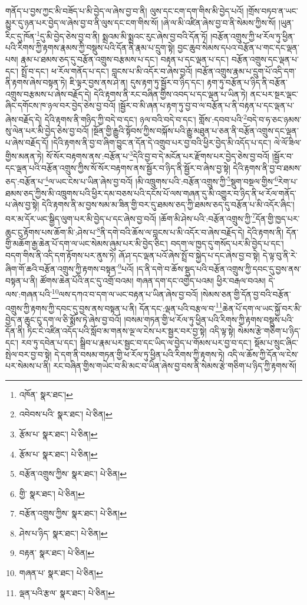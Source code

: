 གནོད་པ་བྱས་ཀྱང་མི་བཟོད་པ་མི་བྱེད་ལ་ཞེས་བྱ་བ་ནི། ལུས་དང་ངག་དག་གིས་མི་བྱེད་པའོ། །གྲོས་བཏབ་ན་ཡང་མྱུར་དུ་ཉན་པར་བྱེད་ལ་ཞེས་བྱ་བ་ནི་ལུས་དང་ངག་གིས་སོ། །ཞེ་ལ་མི་འཛིན་ཞེས་བྱ་བ་ནི་སེམས་ཀྱིས་སོ། །ཡུན་རིང་དུ་ཁོན་\footnote{འཁོན་  སྣར་ཐང་། }དུ་མི་བྱེད་ཅེས་བྱ་བ་ནི། སྨྲའམ་མི་སྨྲའང་རུང་ཞེས་བྱ་བའི་དོན་ཏོ། །བརྩོན་འགྲུས་ཀྱི་ཕ་རོལ་ཏུ་ཕྱིན་པའི་རིགས་ཀྱི་རྟགས་རྣམས་ཀྱི་བསྡུས་པའི་དོན་ནི་རྣམ་པ་དྲུག་སྟེ། བྱང་ཆུབ་སེམས་དཔའ་བརྩོན་པ་གང་དང་ལྡན་པས། རྣམ་པ་ཐམས་ཅད་དུ་བརྩོན་འགྲུས་བརྩམས་པ་དང་། བརྟན་པ་དང་ལྡན་པ་དང་། བརྩོན་འགྲུས་དང་ལྡན་པ་དང་། སྤྲོ་བ་དང་། ཕ་རོལ་གནོད་པ་དང་། བླངས་པ་མི་འདོར་བ་ཞེས་བྱའོ། །བརྩོན་འགྲུས་རྣམ་པ་དྲུག་པོ་འདི་དག་ནི་རྟགས་ཞེས་བསྟན་ཏེ། ཇི་ལྟར་བྱས་ནས་ཤེ་ན། དུས་རྟག་ཏུ་སྦྱོར་བ་ཉིད་དང་། རྟག་ཏུ་བརྩོན་པ་ཉིད་ནི་བརྩོན་འགྲུས་བརྩམས་པ་ཞེས་བརྗོད་དེ། དེའི་རྟགས་ནི་རང་བཞིན་གྱིས་འབད་པ་དང་ལྡན་པ་ཡིན་ཏེ། ནང་པར་སྔར་ལྡང་ཞིང་དགོངས་ཁ་ཉལ་བར་བྱེད་ཅེས་བྱ་བའོ། །སྦྱོར་བ་མི་ཞན་པ་རྟག་ཏུ་བྱ་བ་ལ་བརྩོན་པ་ནི་བརྟན་པ་དང་ལྡན་པ་ཞེས་བརྗོད་དེ། དེའི་རྟགས་ནི་གཉིད་ཀྱི་བདེ་བ་དང་། ཉལ་བའི་བདེ་བ་དང་། གློས་:དབབ་པའི་\footnote{འབེབས་པའི་  སྣར་ཐང་།  པེ་ཅིན། }བདེ་བ་ཧ་ཅང་ཉམས་སུ་ལེན་པར་མི་བྱེད་ཅེས་བྱ་བའོ། །སྔོན་གྱི་རྒྱུའི་སྟོབས་ཀྱིས་བསྐོས་པའི་རྒྱུ་མཐུན་པ་ཅན་ནི་བརྩོན་འགྲུས་དང་ལྡན་པ་ཞེས་བརྗོད་དོ། །དེའི་རྟགས་ནི་བྱ་བ་ཞིག་བྱུང་ན་དོན་དེ་འགྲུབ་པར་བྱ་བའི་ཕྱིར་བྱེད་མི་འདོད་པ་དང་། ལེ་ལོ་ཟིལ་གྱིས་མནན་ཏེ། སོ་སོར་བརྟགས་ནས་:བརྩོན་པ་\footnote{རྩོམ་པ་  སྣར་ཐང་།  པེ་ཅིན། }དེའི་བྱ་བ་དེ་མངོན་པར་རྫོགས་པར་བྱེད་ཅེས་བྱ་བའོ། །སྦྱོར་བ་དང་ལྡན་པའི་བརྩོན་འགྲུས་ཀྱིས་སོ་སོར་བརྟགས་ནས་སྦྱོར་བ་ཉིད་ནི་སྦྱོར་བ་ཞེས་བྱ་སྟེ། དེའི་རྟགས་ནི་བྱ་བ་ཐམས་ཅད་:བརྩོན་པ་\footnote{རྩོམ་པ་  སྣར་ཐང་།  པེ་ཅིན། }ལ་ཡང་ངེས་པ་ཡིན་ཞེས་བྱ་བའོ། །མི་འཁྲུགས་པའི་:བརྩོན་འགྲུས་ཀྱི་\footnote{བརྩོན་འགྲུས་ཀྱིས་  སྣར་ཐང་།  པེ་ཅིན། }སྡུག་བསྔལ་གྱིས་\footnote{གྱི་  སྣར་ཐང་།  པེ་ཅིན། }རེག་པ་ཐམས་ཅད་ཀྱིས་མི་འཁྲུགས་པའི་ཕྱིར་དམ་བཅས་པའི་དངོས་པོ་ལས་གཞན་དུ་མི་འགྱུར་བ་ཉིད་ནི་ཕ་རོལ་གནོད་པ་ཞེས་བྱ་སྟེ། དེའི་རྟགས་ནི་མ་བྱས་སམ་མ་ཟིན་གྱི་བར་དུ་ཐམས་ཅད་ཀྱི་ཐམས་ཅད་དུ་བརྩོན་པ་མི་འདོར་ཞིང་། བར་མ་དོར་ཡང་སྒྱིད་ལུག་པར་མི་བྱེད་པ་དང་ཞེས་བྱ་བའོ། །ཆོག་མི་ཤེས་པའི་:བརྩོན་འགྲུས་ཀྱི་\footnote{བརྩོན་འགྲུས་ཀྱིས་  སྣར་ཐང་།  པེ་ཅིན། }དོན་གྱི་ཁྱད་པར་ཆུང་ངུ་རྟོགས་པས་ཆོག་མི་:ཤེས་པ་\footnote{ཤེས་པ་ཉིད་  སྣར་ཐང་།  པེ་ཅིན། }ནི་དགེ་བའི་ཆོས་ལ་བླངས་པ་མི་འདོར་བ་ཞེས་བརྗོད་དེ། དེའི་རྟགས་ནི། དོན་གྱི་མཆོག་རྒྱ་ཆེན་པོ་དག་ལ་ཡང་སེམས་ཞུམ་པར་མི་བྱེད་ཅིང་། བདག་ལ་ཁྱད་དུ་གསོད་པར་མི་བྱེད་པ་དང་། བདག་གིས་ནི་འདི་དག་རྟོགས་པར་ནུས་ཏེ། ཞོ་ཤ་དང་ལྡན་པའོ་ཞེས་སྤྲོ་བ་སྐྱེད་པ་དང་ཞེས་བྱ་བ་སྟེ། དེ་ལྟ་བུ་ནི་རེ་ཞིག་གོ་ཆའི་བརྩོན་འགྲུས་ཀྱི་རྟགས་བསྟན་\footnote{བརྟན་  སྣར་ཐང་།  པེ་ཅིན། }པའོ། །ད་ནི་དགེ་བ་ཆོས་སྡུད་པའི་བརྩོན་འགྲུས་ཀྱི་དབང་དུ་བྱས་ནས་བསྟན་པ་ནི། ཚོགས་ཆེན་པོའི་ནང་དུ་འགྲོ་བའམ། གཞན་དག་དང་འགྱེད་པའམ། ཕྱིར་བརྒལ་བའམ། དེ་ལས་:གཞན་པའི་\footnote{གཞན་པ་  སྣར་ཐང་།  པེ་ཅིན། }ལས་དཀའ་བ་དག་ལ་ཡང་བརྟན་པ་ཡིན་ཞེས་བྱ་བའོ། །སེམས་ཅན་གྱི་དོན་བྱ་བའི་བརྩོན་འགྲུས་ཀྱི་རྟགས་ཀྱི་དབང་དུ་བྱས་ནས་བསྟན་པ་ནི། དོན་དང་:ལྡན་པའི་བརྩལ་བ་\footnote{ལྡན་པའི་རྩལ་  སྣར་ཐང་།  པེ་ཅིན། }ཆེན་པོ་དག་ལ་ཡང་སྐྱོ་བར་མི་བྱེད་ན་ཆུང་ངུ་དག་ལ་ཅི་སྨོས་ཏེ་ཞེས་བྱ་བའོ། །བསམ་གཏན་གྱི་ཕ་རོལ་ཏུ་ཕྱིན་པའི་རིགས་ཀྱི་རྟགས་བསྡུས་པའི་དོན་ནི། ཏིང་ངེ་འཛིན་འདོད་པའི་སློབ་མ་གནས་ལྔ་ལ་ངེས་པར་སྦྱར་བར་བྱ་སྟེ། འདི་ལྟ་སྟེ། སེམས་རྩེ་གཅིག་པ་ཉིད་དང་། རབ་ཏུ་དབེན་པ་དང་། སྒྲིབ་པ་རྣམ་པར་སྦྱང་བ་དང་ཡིད་ལ་བྱེད་པ་གོམས་པར་བྱ་བ་དང་། སྡོམ་པ་སྲུང་ཞིང་སྤེལ་བར་བྱ་བ་སྟེ། དེ་དག་ནི་བསམ་གཏན་གྱི་ཕ་རོལ་ཏུ་ཕྱིན་པའི་རིགས་ཀྱི་རྟགས་ཏེ། འདི་ལ་ཆོས་ཀྱི་དོན་ལ་ངེས་པར་སེམས་པ་ནི། རང་བཞིན་གྱིས་གཡེང་བ་མི་མང་བ་ཡིན་ཞེས་བྱ་བས་ནི་སེམས་རྩེ་གཅིག་པ་ཉིད་ཀྱི་རྟགས་སོ། 